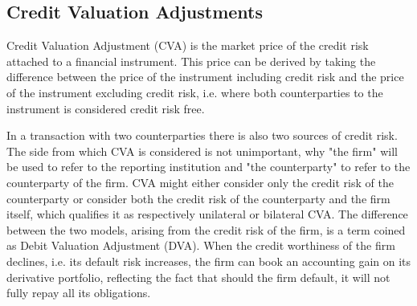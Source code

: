 \documentclass[../../../main.tex]{subfiles}
\begin{document}
    \subsection{Credit Valuation Adjustments}
        Credit Valuation Adjustment (CVA) is the market price of the credit risk attached to a financial instrument.
        This price can be derived by taking the difference between the price of the instrument including credit risk
        and the price of the instrument excluding credit risk, 
        i.e. where both counterparties to the instrument is considered credit risk free.

        In a transaction with two counterparties there is also two sources of credit risk.
        The side from which CVA is considered is not unimportant, 
        why "the firm" will be used to refer to the reporting institution 
        and "the counterparty" to refer to the counterparty of the firm.
        CVA might either consider only the credit risk of the counterparty 
        or consider both the credit risk of the counterparty and the firm itself,
        which qualifies it as respectively unilateral or bilateral CVA.
        The difference between the two models, arising from the credit risk of the firm,
        is a term coined as Debit Valuation Adjustment (DVA).
        When the credit worthiness of the firm declines, i.e. its default risk increases,
        the firm can book an accounting gain on its derivative portfolio,
        reflecting the fact that should the firm default, it will not fully repay all its obligations.
\end{document}
